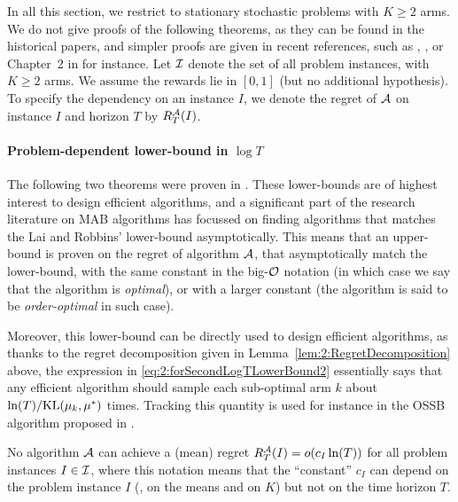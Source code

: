 In all this section, we restrict to stationary stochastic problems with $K\geq2$ arms.
We do not give proofs of the following theorems, as they can be found in the historical papers, and simpler proofs are given in recent references, such as \cite{Bubeck12}, \cite{LattimoreBanditAlgorithmsBook}, or Chapter~2 in \cite{Slivkins2019} for instance.
%
Let $\mathcal{I}$ denote the set of all problem instances, with $K \geq 2$ arms. We assume the rewards lie in $[0,1]$ (but no additional hypothesis).
To specify the dependency on an instance $I$, we denote the regret of $\mathcal{A}$ on instance $I$ and horizon $T$ by $R_T^{\mathcal{A}}(I)$.


\paragraph{Problem-dependent lower-bound in $\log T$}

The following two theorems were proven in \cite{LaiRobbins85}.
These lower-bounds are of highest interest to design efficient algorithms,
and a significant part of the research literature on MAB algorithms has focussed on finding algorithms that matches the Lai and Robbins' lower-bound asymptotically.
This means that an upper-bound is proven on the regret of algorithm $\mathcal{A}$, that asymptotically match the lower-bound, with the same constant in the big-$\mathcal{O}$ notation (in which case we say that the algorithm is \emph{optimal}), or with a larger constant (the algorithm is said to be \emph{order-optimal} in such case).

Moreover, this lower-bound can be directly used to design efficient algorithms, as thanks to the regret decomposition given in Lemma~\ref{lem:2:RegretDecomposition} above, the expression in \eqref{eq:2:forSecondLogTLowerBound2} essentially says that any efficient algorithm
should sample each sub-optimal arm $k$ about $\ln(T)/\mathrm{KL}(\mu_k,\mu^*)$ times.
Tracking this quantity is used for instance in the OSSB algorithm proposed in \cite{Combes17}.

\begin{theorem}\label{thm:2:firstLogTLowerBound}
    No algorithm $\mathcal{A}$ can achieve a (mean) regret $R_T^{\mathcal{A}}(I) = \mathop{}\mathopen{}o\mathopen{}\left(c_I \ln(T)\right)$ for all problem instances $I \in \mathcal{I}$,
    where this notation means that the ``constant'' $c_I$ can depend on the problem instance $I$ (\eg, on the means and on $K$) but not on the time horizon $T$.
\end{theorem}

